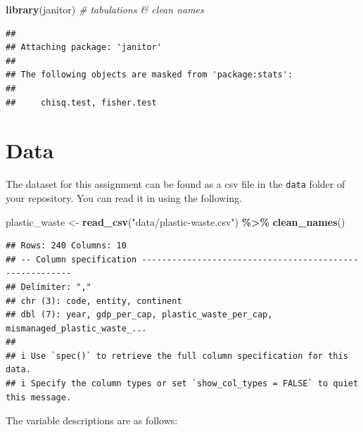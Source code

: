 \documentclass[
]{article}
\newenvironment{Shaded}{\begin{snugshade}}{\end{snugshade}}
\newcommand{\CommentTok}[1]{\textcolor[rgb]{0.56,0.35,0.01}{\textit{#1}}}
\newcommand{\FunctionTok}[1]{\textcolor[rgb]{0.13,0.29,0.53}{\textbf{#1}}}
\newcommand{\NormalTok}[1]{#1}
\newcommand{\OtherTok}[1]{\textcolor[rgb]{0.56,0.35,0.01}{#1}}
\newcommand{\SpecialCharTok}[1]{\textcolor[rgb]{0.81,0.36,0.00}{\textbf{#1}}}
\newcommand{\StringTok}[1]{\textcolor[rgb]{0.31,0.60,0.02}{#1}}
\begin{document}
\begin{Shaded}
\begin{Highlighting}[]
\FunctionTok{library}\NormalTok{(janitor) }\CommentTok{\# tabulations \& clean names}
\end{Highlighting}
\end{Shaded}

\begin{verbatim}
## 
## Attaching package: 'janitor'
## 
## The following objects are masked from 'package:stats':
## 
##     chisq.test, fisher.test
\end{verbatim}

\section{Data}\label{data}

The dataset for this assignment can be found as a csv file in the
\texttt{data} folder of your repository. You can read it in using the
following.

\begin{Shaded}
\begin{Highlighting}[]
\NormalTok{plastic\_waste }\OtherTok{\textless{}{-}} \FunctionTok{read\_csv}\NormalTok{(}\StringTok{"data/plastic{-}waste.csv"}\NormalTok{) }\SpecialCharTok{\%\textgreater{}\%}
  \FunctionTok{clean\_names}\NormalTok{()}
\end{Highlighting}
\end{Shaded}

\begin{verbatim}
## Rows: 240 Columns: 10
## -- Column specification --------------------------------------------------------
## Delimiter: ","
## chr (3): code, entity, continent
## dbl (7): year, gdp_per_cap, plastic_waste_per_cap, mismanaged_plastic_waste_...
## 
## i Use `spec()` to retrieve the full column specification for this data.
## i Specify the column types or set `show_col_types = FALSE` to quiet this message.
\end{verbatim}

The variable descriptions are as follows:
\end{document}
